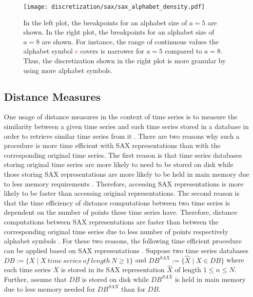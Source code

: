 \begin{figure}[htb]
\centering
\texttt{[image: discretization/sax/sax\_alphabet\_density.pdf]}
\caption[Symbolic Aggregate Approximation - Effect of Alphabet Size]{In the left plot, the breakpoints for an alphabet size of $a = 5$ are shown. In the right plot, the breakpoints for an alphabet size of $a = 8$ are shown. For instance, the range of continuous values the alphabet symbol \textcolor{red}{c} covers is narrower for $a = 5$ compared to $a = 8$. Thus, the discretization shown in the right plot is more granular by using more alphabet symbols.}
\label{fig:SAX_alphabet_size}
\end{figure}
\subsection*{Distance Measures} \label{dist_measure_mindist}
One usage of distance measures in the context of time series is to measure the similarity between a given time series and each time series stored in a database in order to retrieve similar time series from it \cite{Survey_Esling}. There are two reasons why such a procedure is more time efficient with \ac{SAX} representations than  with the corresponding original time series. \newline
The first reason is that time series databases storing original time series are more likely to need to be stored on disk while those storing \ac{SAX} representations are more likely to be held in main memory due to less memory requirements \cite{SAX_Lin}. Therefore, accessing \ac{SAX} representations is more likely to be faster than accessing original representations. \newline
The second reason is that the time efficiency of distance computations between two time series is dependent on the number of points these time series have. Therefore, distance computations between \ac{SAX} representations are faster than between the corresponding original time series due to less number of points respectively alphabet symbols \cite{SAX_Lin}. \newline
For these two reasons, the following time efficient procedure can be applied based on \ac{SAX} representations \cite{SAX_Lin, Faloutsos_Bounding_Lemma}. \newline
Suppose two time series databases $DB := \{X \mid X \ time \ series \ of \ length \ N \geq 1\}$ and $DB^{SAX} := \{\hat{X} \mid X \in DB\}$ where each time series $X$ is stored in its \ac{SAX} representation $\hat{X}$ of length $ 1 \leq n \leq N$.  Further, assume that $DB$ is stored on disk while $DB^{SAX}$ is held in main memory due to less memory needed for $DB^{SAX}$ than for $DB$. \newline

